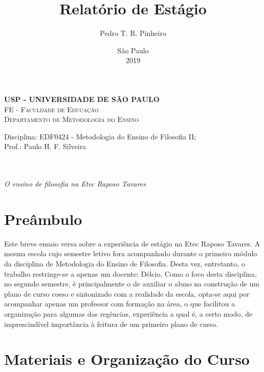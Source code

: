 \documentclass[12pt,a4paper]{article}
\author{Pedro T. R. Pinheiro}
\date{São Paulo\\2019}
\title{Relatório de Estágio}
\newcommand{\subtitulo}{O ensino de filosofia na Etec Raposo Tavares}
\newcommand{\disciplina}{EDF0424 - Metodologia do Ensino de Filosofia II}
\newcommand{\departamento}{Departamento de Metodologia do Ensino}
\newcommand{\unidade}{FE - Faculdade de Educação}
\newcommand{\prof}{Paulo H. F. Silveira}
\begin{document}
	\begin{center}
				\textbf{
				\LARGE USP - UNIVERSIDADE DE SÃO PAULO \\
			}
			\Large \textsc{\unidade} \\
			\large \textsc{\departamento}\\
			\vspace*{1cm}
				
			Disciplina: \disciplina; \\Prof.: \prof
			\vfill
			\begin{center}
				{\Large \textsc{\theauthor}} \\ 
				\vspace{1cm}
				\LARGE\textbf{\thetitle} \\
				\Large\emph{\subtitulo}
			\end{center}
			\vfill
			\large\thedate
			\vspace*{1cm}
			\thispagestyle{empty}			
	\end{center}

	\newpage

	\setlength{\parskip}{0.5cm}
	\setlength{\parindent}{1.1cm}
	\onehalfspacing
	
	\section{Preâmbulo}
	
	Este breve ensaio versa sobre a experiência de estágio na Etec Raposo 
	Tavares. A mesma escola cujo semestre letivo fora acompanhado durante 
	o primeiro módulo da disciplina de Metodologia do Ensino de Filosofia. 
	Desta vez, entretanto, o trabalho restringe-se a apenas um docente: Délcio. Como o foco desta disciplina, no segundo semestre, é principalmente o de auxiliar o aluno na construção de um plano de curso coeso e sintonizado com a realidade da escola, opta-se aqui por acompanhar apenas um professor com formação na área, o que facilitou a organização para algumas das regências, experiência a qual é, a certo modo, de imprescindível importância à feitura de um primeiro plano de curso. 
	
	
	
	\newpage
	
	\section{Materiais e Organização do Curso}
	
\end{document}
